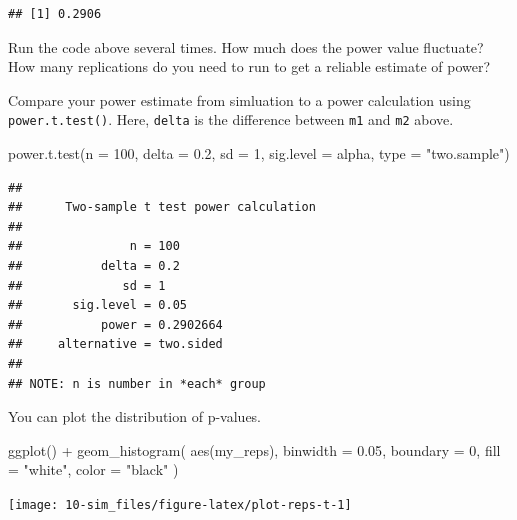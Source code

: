 \documentclass[
  oneside]{book}
\newenvironment{Shaded}{\begin{snugshade}}{\end{snugshade}}
\newcommand{\AttributeTok}[1]{\textcolor[rgb]{0.77,0.63,0.00}{#1}}
\newcommand{\DecValTok}[1]{\textcolor[rgb]{0.00,0.00,0.81}{#1}}
\newcommand{\FloatTok}[1]{\textcolor[rgb]{0.00,0.00,0.81}{#1}}
\newcommand{\FunctionTok}[1]{\textcolor[rgb]{0.00,0.00,0.00}{#1}}
\newcommand{\NormalTok}[1]{#1}
\newcommand{\SpecialCharTok}[1]{\textcolor[rgb]{0.00,0.00,0.00}{#1}}
\newcommand{\StringTok}[1]{\textcolor[rgb]{0.31,0.60,0.02}{#1}}
\begin{document}
\begin{verbatim}
## [1] 0.2906
\end{verbatim}

\begin{try}
Run the code above several times. How much does the power value fluctuate? How many replications do you need to run to get a reliable estimate of power?

\end{try}

Compare your power estimate from simluation to a power calculation using \texttt{power.t.test()}. Here, \texttt{delta} is the difference between \texttt{m1} and \texttt{m2} above.

\begin{Shaded}
\begin{Highlighting}[]
\FunctionTok{power.t.test}\NormalTok{(}\AttributeTok{n =} \DecValTok{100}\NormalTok{, }
             \AttributeTok{delta =} \FloatTok{0.2}\NormalTok{, }
             \AttributeTok{sd =} \DecValTok{1}\NormalTok{, }
             \AttributeTok{sig.level =}\NormalTok{ alpha, }
             \AttributeTok{type =} \StringTok{"two.sample"}\NormalTok{)}
\end{Highlighting}
\end{Shaded}

\begin{verbatim}
## 
##      Two-sample t test power calculation 
## 
##               n = 100
##           delta = 0.2
##              sd = 1
##       sig.level = 0.05
##           power = 0.2902664
##     alternative = two.sided
## 
## NOTE: n is number in *each* group
\end{verbatim}

You can plot the distribution of p-values.

\begin{Shaded}
\begin{Highlighting}[]
\FunctionTok{ggplot}\NormalTok{() }\SpecialCharTok{+} 
  \FunctionTok{geom\_histogram}\NormalTok{(}
    \FunctionTok{aes}\NormalTok{(my\_reps), }
    \AttributeTok{binwidth =} \FloatTok{0.05}\NormalTok{, }
    \AttributeTok{boundary =} \DecValTok{0}\NormalTok{,}
    \AttributeTok{fill =} \StringTok{"white"}\NormalTok{, }
    \AttributeTok{color =} \StringTok{"black"}
\NormalTok{  )}
\end{Highlighting}
\end{Shaded}

\begin{center}\texttt{[image: 10-sim\_files/figure-latex/plot-reps-t-1]} \end{center}
\end{document}
